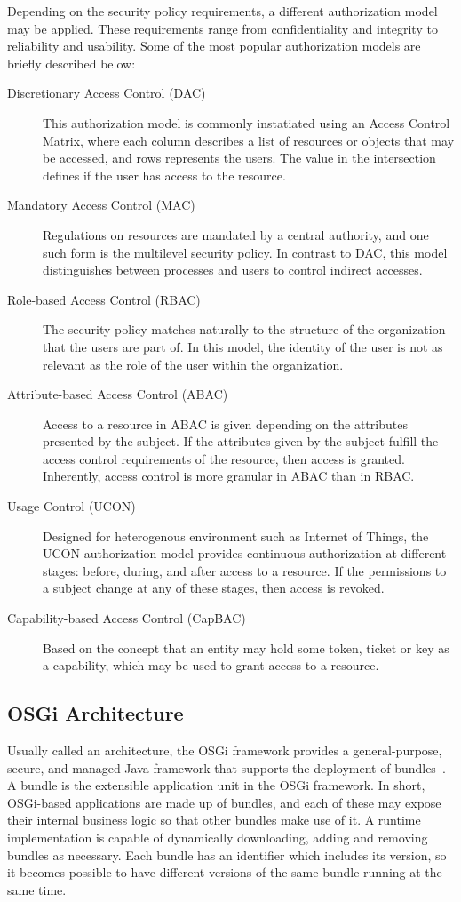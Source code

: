 \documentclass[12pt]{article}
\begin{document}
Depending on the security policy requirements, a different authorization model may be applied. These requirements range from confidentiality and integrity to reliability and usability. Some of the most popular authorization models are briefly described below:

\begin{description}
\item[Discretionary Access Control (DAC)] This authorization model is commonly instatiated using an Access Control Matrix, where each column describes a list of resources or objects that may be accessed, and rows represents the users. The value in the intersection defines if the user has access to the resource.
\item[Mandatory Access Control (MAC)] Regulations on resources are mandated by a central authority, and one such form is the multilevel security policy. In contrast to DAC, this model distinguishes between processes and users to control indirect accesses.
\item[Role-based Access Control (RBAC)] The security policy matches naturally to the structure of the organization that the users are part of. In this model, the identity of the user is not as relevant as the role of the user within the organization.
\item[Attribute-based Access Control (ABAC)] Access to a resource in ABAC is given depending on the attributes presented by the subject. If the attributes given by the subject fulfill the access control requirements of the resource, then access is granted. Inherently, access control is more granular in ABAC than in RBAC.
\item[Usage Control (UCON)] Designed for heterogenous environment such as Internet of Things, the UCON authorization model provides continuous authorization at different stages: before, during, and after access to a resource. If the permissions to a subject change at any of these stages, then access is revoked. 
\item[Capability-based Access Control (CapBAC)] Based on the concept that an entity may hold some token, ticket or key as a capability, which may be used to grant access to a resource. 
\end{description}

\subsection{OSGi Architecture}

Usually called an architecture, the OSGi framework provides a general-purpose, secure, and managed Java framework that supports the deployment of bundles~\cite{osgi_core}. A bundle is the extensible application unit in the OSGi framework. In short, OSGi-based applications are made up of bundles, and each of these may expose their internal business logic so that other bundles make use of it. A runtime implementation is capable of dynamically downloading, adding and removing bundles as necessary. Each bundle has an identifier which includes its version, so it becomes possible to have different versions of the same bundle running at the same time. 
\end{document}
